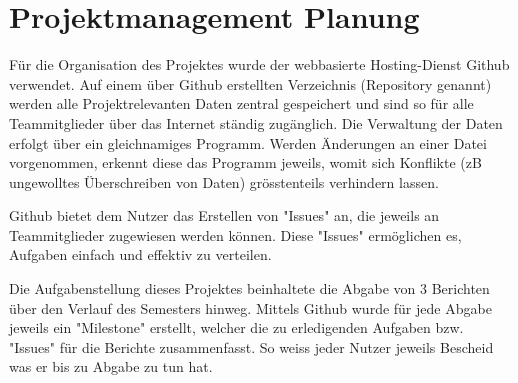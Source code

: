 \section{Projektmanagement Planung}
Für die Organisation des Projektes wurde der webbasierte Hosting-Dienst Github verwendet. Auf einem über Github erstellten Verzeichnis (Repository genannt) werden alle Projektrelevanten Daten zentral gespeichert und sind so für alle Teammitglieder über das Internet ständig zugänglich. Die Verwaltung der Daten erfolgt über ein gleichnamiges Programm. Werden Änderungen an einer Datei vorgenommen, erkennt diese das Programm jeweils, womit sich Konflikte (zB ungewolltes Überschreiben von Daten) grösstenteils verhindern lassen.

Github bietet dem Nutzer das Erstellen von "Issues" an, die jeweils an Teammitglieder zugewiesen werden können. Diese "Issues" ermöglichen es, Aufgaben einfach und effektiv zu verteilen.

Die Aufgabenstellung dieses Projektes beinhaltete die Abgabe von 3 Berichten über den Verlauf des Semesters hinweg. Mittels Github wurde für jede Abgabe jeweils ein "Milestone" erstellt, welcher die zu erledigenden Aufgaben bzw. "Issues" für die Berichte zusammenfasst. So weiss jeder Nutzer jeweils Bescheid was er bis zu Abgabe zu tun hat.







